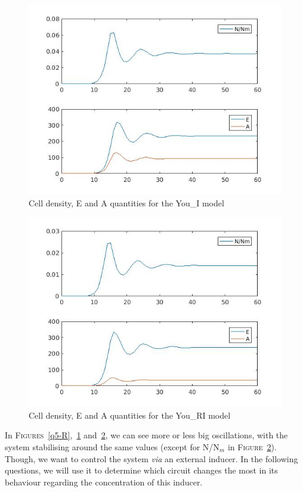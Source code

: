 \documentclass[11pt,a4paper]{report}
\begin{document}
\begin{figure}[!ht]
  \begin{center}
    \includegraphics[width=0.7\linewidth]{Figure3.jpg}
    \caption{Cell density, E and A quantities for the You\_I model}
    \label{q5-I}
  \end{center}
\end{figure}

\begin{figure}[!ht]
  \begin{center}
    \includegraphics[width=0.7\linewidth]{Figure4.jpg}
    \caption{Cell density, E and A quantities for the You\_RI model}
    \label{q5-RI}
  \end{center}
\end{figure}

In \textsc{Figures}~\ref{q5-R},~\ref{q5-I} and~\ref{q5-RI}, we can see more or less big oscillations, with the system stabilising around the same values (except for N/N$_m$ in \textsc{Figure}~\ref{q5-RI}). Though, we want to control the system \textit{via} an external inducer. In the following questions, we will use it to determine which circuit changes the most in its behaviour regarding the concentration of this inducer.
\end{document}
